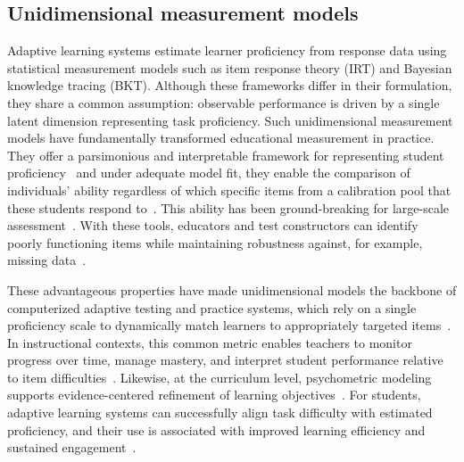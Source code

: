 \documentclass[11pt]{article}
\begin{document}
\subsection{Unidimensional measurement models}
Adaptive learning systems estimate learner proficiency from response data using statistical measurement models such as item response theory (IRT) and Bayesian knowledge tracing (BKT). Although these frameworks differ in their formulation, they share a common assumption: observable performance is driven by a single latent dimension representing task proficiency. Such unidimensional measurement models have fundamentally transformed educational measurement in practice. They offer a parsimonious and interpretable framework for representing student proficiency~\parencite{rasch1993probabilistic, hambleton1991fundamentals, embretson2013item, de2013theory} and under adequate model fit, they enable the comparison of individuals' ability regardless of which specific items from a calibration pool that these students respond to~\parencite{rasch1993probabilistic, wright1982rating}. This ability has been ground-breaking for large-scale assessment~\parencite{lord2012applications, van2010elements}. With these tools, educators and test constructors can identify poorly functioning items while maintaining robustness against, for example, missing data~\parencite{mislevy1996missing, de2013theory}.  

These advantageous properties have made unidimensional models the backbone of computerized adaptive testing and practice systems, which rely on a single proficiency scale to dynamically match learners to appropriately targeted items~\parencite{weiss1982improving, van2010elements, magis2017computerized}. In instructional contexts, this common metric enables teachers to monitor progress over time, manage mastery, and interpret student performance relative to item difficulties~\parencite{corbett1995knowledge, maris2012speed, deonovic2018learning, saric-grgic2024twenty-five}. Likewise, at the curriculum level, psychometric modeling supports evidence-centered refinement of learning objectives~\parencite{mislevy1996missing, glaser2001knowing}. For students, adaptive learning systems can successfully align task difficulty with estimated proficiency, and their use is associated with improved learning efficiency and sustained engagement~\parencite{eggen2006optimal, ma2014intelligent, van2010elements}. 
\end{document}
